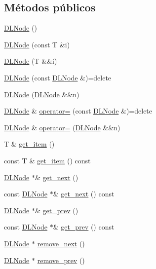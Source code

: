 \subsection*{Métodos públicos}
\begin{DoxyCompactItemize}
\item 
\hyperlink{class_designar_1_1_d_l_node_aac2adda6b4d737b47d461efe02401f01}{D\+L\+Node} ()
\item 
\hyperlink{class_designar_1_1_d_l_node_af55ccc85dacdef9932b36e1ebd681306}{D\+L\+Node} (const T \&i)
\item 
\hyperlink{class_designar_1_1_d_l_node_a4c90cd184cdec513673fece07a858221}{D\+L\+Node} (T \&\&i)
\item 
\hyperlink{class_designar_1_1_d_l_node_aa70f9ca6c57dc2731ef5cff85fc849ba}{D\+L\+Node} (const \hyperlink{class_designar_1_1_d_l_node}{D\+L\+Node} \&)=delete
\item 
\hyperlink{class_designar_1_1_d_l_node_a9c80165d85c73bb4815e3ca098c1e72b}{D\+L\+Node} (\hyperlink{class_designar_1_1_d_l_node}{D\+L\+Node} \&\&n)
\item 
\hyperlink{class_designar_1_1_d_l_node}{D\+L\+Node} \& \hyperlink{class_designar_1_1_d_l_node_a790e90bcc8e4c5047e576aeaa1374291}{operator=} (const \hyperlink{class_designar_1_1_d_l_node}{D\+L\+Node} \&)=delete
\item 
\hyperlink{class_designar_1_1_d_l_node}{D\+L\+Node} \& \hyperlink{class_designar_1_1_d_l_node_a4993e8544e88f3ba0552d8e4005f6fac}{operator=} (\hyperlink{class_designar_1_1_d_l_node}{D\+L\+Node} \&\&n)
\item 
T \& \hyperlink{class_designar_1_1_d_l_node_a5f116af77588dcefd27fc92e679c27d2}{get\+\_\+item} ()
\item 
const T \& \hyperlink{class_designar_1_1_d_l_node_ac6c814f0d4d13daa3f69e6311fea83a8}{get\+\_\+item} () const
\item 
\hyperlink{class_designar_1_1_d_l_node}{D\+L\+Node} $\ast$\& \hyperlink{class_designar_1_1_d_l_node_a28ad2b7a46044b5e798e06888631bbde}{get\+\_\+next} ()
\item 
const \hyperlink{class_designar_1_1_d_l_node}{D\+L\+Node} $\ast$\& \hyperlink{class_designar_1_1_d_l_node_a2e9212d8d5bec7b811c8ca11948bdad6}{get\+\_\+next} () const
\item 
\hyperlink{class_designar_1_1_d_l_node}{D\+L\+Node} $\ast$\& \hyperlink{class_designar_1_1_d_l_node_a17271ebf6fc77a191c1a4a9c70fdb702}{get\+\_\+prev} ()
\item 
const \hyperlink{class_designar_1_1_d_l_node}{D\+L\+Node} $\ast$\& \hyperlink{class_designar_1_1_d_l_node_ad994f44ae1d1f56a318796d763361372}{get\+\_\+prev} () const
\item 
\hyperlink{class_designar_1_1_d_l_node}{D\+L\+Node} $\ast$ \hyperlink{class_designar_1_1_d_l_node_a8ff44fbe079ffd92ad09d3e6c5ec0458}{remove\+\_\+next} ()
\item 
\hyperlink{class_designar_1_1_d_l_node}{D\+L\+Node} $\ast$ \hyperlink{class_designar_1_1_d_l_node_a0bd2bf491ab61ab3fd1eb6b8b06dcae5}{remove\+\_\+prev} ()
\end{DoxyCompactItemize}


